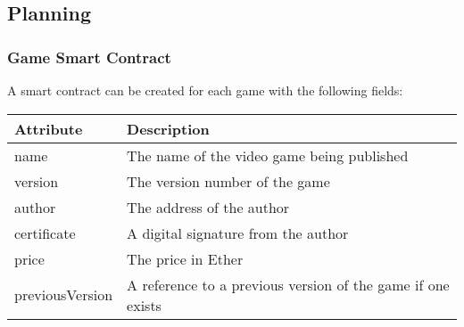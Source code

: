 
\subsection*{Planning}

\subsubsection*{Game Smart Contract}

A smart contract can be created for each game with the following fields:

\begin{longtable}{p{} p{} }
  \toprule
  \textbf{Attribute} & \textbf{Description}
  \\\midrule\midrule
  name               & The name of the video game being published                  \\
  version            & The version number of the game                              \\
  author             & The address of the author                                   \\
  certificate        & A digital signature from the author                         \\
  price              & The price in Ether                                          \\
  previousVersion    & A reference to a previous version of the game if one exists \\
  \bottomrule\bottomrule
\end{longtable}